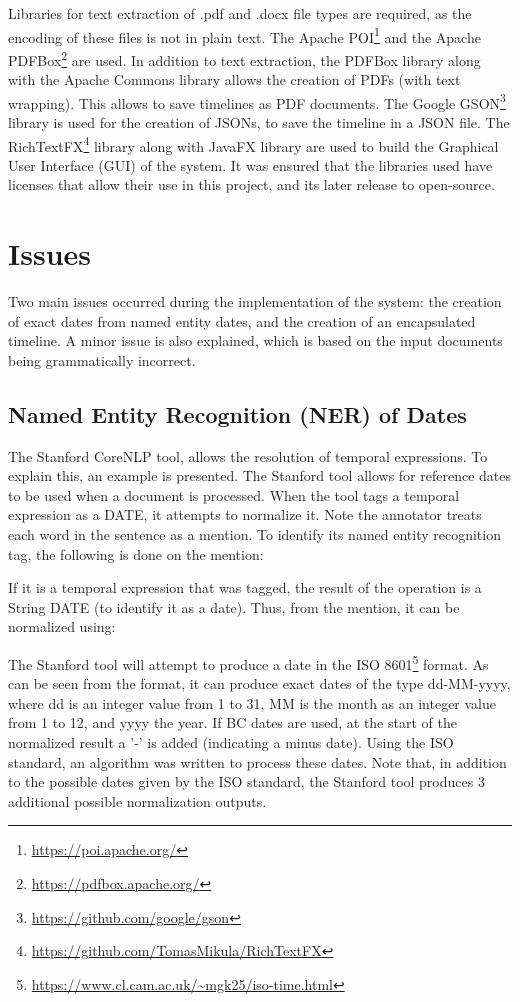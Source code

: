 \par Libraries for text extraction of .pdf and .docx file types are required, as the encoding of these files is not in plain text. The Apache POI\footnote{\url{https://poi.apache.org/}} and the Apache PDFBox\footnote{\url{https://pdfbox.apache.org/}} are used. In addition to text extraction, the PDFBox library along with the Apache Commons library allows the creation of PDFs (with text wrapping). This allows to save timelines as PDF documents. The Google GSON\footnote{\url{https://github.com/google/gson}} library is used for the creation of JSONs, to save the timeline in a JSON file. The RichTextFX\footnote{\url{https://github.com/TomasMikula/RichTextFX}} library along with JavaFX library are used to build the Graphical User Interface (GUI) of the system. It was ensured that the libraries used have licenses that allow their use in this project, and its later release to open-source.

\section{Issues}
\par Two main issues occurred during the implementation of the system: the creation of exact dates from named  entity dates, and the creation of an encapsulated timeline. A minor issue is also explained, which is based on the input documents being grammatically incorrect.

\subsection{Named Entity Recognition (NER) of Dates}
\par The Stanford CoreNLP tool, allows the resolution of temporal expressions. To explain this, an example is presented. The Stanford tool allows for reference dates to be used when a document is processed. When the tool tags a temporal expression as a DATE, it attempts to normalize it. Note the annotator treats each word in the sentence as a mention. To identify its named entity recognition tag, the following is done on the mention: \par
{}
If it is a temporal expression that was tagged, the result of the operation is a String DATE (to identify it as a date). Thus, from the mention, it can be normalized using: \par
{}
The Stanford tool will attempt to produce a date in the ISO 8601\footnote{\url{https://www.cl.cam.ac.uk/~mgk25/iso-time.html}} format. As can be seen from the format, it can produce exact dates of the type dd-MM-yyyy, where dd is an integer value from 1 to 31, MM is the month as an integer value from 1 to 12, and yyyy the year. If BC dates are used, at the start of the normalized result a '-' is added (indicating a minus date). Using the ISO standard, an algorithm was written to process these dates. Note that, in addition to the possible dates given by the ISO standard, the Stanford tool produces 3 additional possible normalization outputs.

